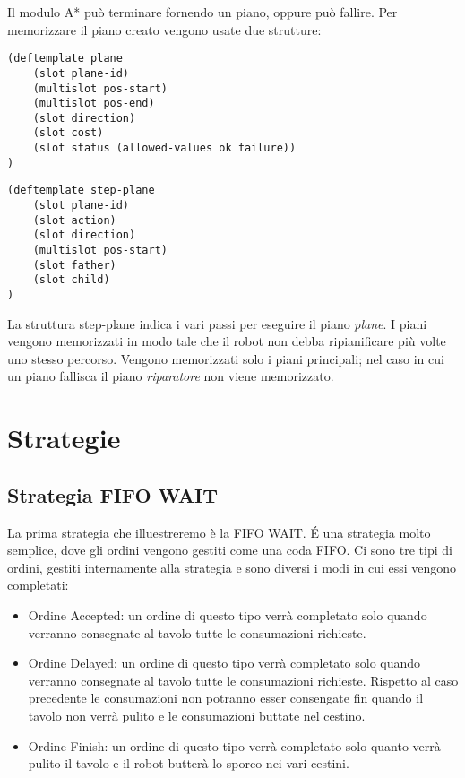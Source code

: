 Il modulo A* può terminare fornendo un piano, oppure può fallire. Per memorizzare il piano creato vengono usate due strutture:

\begin{lstlisting}
(deftemplate plane
	(slot plane-id)
	(multislot pos-start)
	(multislot pos-end)
	(slot direction)
	(slot cost)
	(slot status (allowed-values ok failure))
)
\end{lstlisting}

\begin{lstlisting}
(deftemplate step-plane
	(slot plane-id)
	(slot action)
	(slot direction)
	(multislot pos-start)
	(slot father)
	(slot child)
)
\end{lstlisting}

La struttura step-plane indica i vari passi per eseguire il piano \emph{plane}. I piani vengono memorizzati in modo tale che il robot non debba ripianificare più volte uno stesso percorso. Vengono memorizzati solo i piani principali; nel caso in cui un piano fallisca il piano \emph{riparatore} non viene memorizzato.

\chapter{Strategie}
\section{Strategia FIFO WAIT}
La prima strategia che illuestreremo è la FIFO WAIT. \'E una strategia molto semplice, dove gli ordini vengono gestiti come una coda FIFO. Ci sono tre tipi di ordini, gestiti internamente alla strategia e sono diversi i modi in cui essi vengono completati:\begin{itemize}
  \item Ordine Accepted: un ordine di questo tipo verrà completato solo quando verranno consegnate al tavolo tutte le consumazioni richieste.
  \item Ordine Delayed: un ordine di questo tipo verrà completato solo quando verranno consegnate al tavolo tutte le consumazioni richieste. Rispetto al caso precedente le consumazioni non potranno esser consengate fin quando il tavolo non verrà pulito e le consumazioni buttate nel cestino.
  \item Ordine Finish: un ordine di questo tipo verrà completato solo quanto verrà pulito il tavolo e il robot butterà lo sporco nei vari cestini.
\end{itemize}
\newpage

